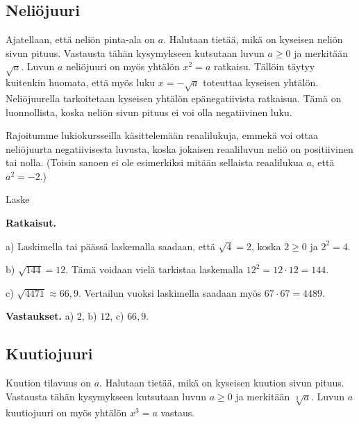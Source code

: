 \subsection*{Neliöjuuri}
\label{neliojuuri}

Ajatellaan, että neliön pinta-ala on $a$. Halutaan tietää, mikä on kyseisen neliön sivun pituus. Vastausta tähän kysymykseen kutsutaan luvun $a\ge 0$  ja merkitään $\sqrt{a}$. Luvun $a$ neliöjuuri on myös yhtälön $x^2 = a$ ratkaisu. Tällöin täytyy kuitenkin huomata, että myös luku $x=-\sqrt{a}$ toteuttaa kyseisen yhtälön. Neliöjuurella tarkoitetaan kyseisen yhtälön epänegatiivista ratkaisua. Tämä on luonnollista, koska neliön sivun pituus ei voi olla negatiivinen luku.


Rajoitumme lukiokursseilla käsittelemään reaalilukuja, emmekä voi ottaa neliöjuurta negatiivisesta luvusta, koska jokaisen reaaliluvun neliö on positiivinen tai nolla. (Toisin sanoen ei ole esimerkiksi mitään sellaista reaalilukua $a$, että $a^2=-2$.)

\begin{esimerkki}
Laske
\begin{alakohdat}


\end{alakohdat}

{\bf Ratkaisut.}

a)
Laskimella tai päässä laskemalla saadaan, että $\sqrt{4} = 2$, koska $2\geq0$ ja $2^2 =4$.

b) 
$\sqrt{144}=12$. Tämä voidaan vielä tarkistaa laskemalla $12^2 = 12\cdot 12=144$.

c)
$\sqrt{4471}\approx 66,9$. Vertailun vuoksi laskimella saadaan myös $67\cdot 67=4489$.

{\bf Vastaukset.}
a) $2$, b) $12$, c) $66,9$.

\end{esimerkki}


\subsection*{Kuutiojuuri}

Kuution tilavuus on $a$. Halutaan tietää, mikä on kyseisen kuution sivun pituus. Vastausta tähän kysymykseen kutsutaan luvun $a\ge 0$  ja merkitään $\sqrt[3]{a}$. Luvun $a$ kuutiojuuri on myös yhtälön $x^3 = a$ vastaus.

